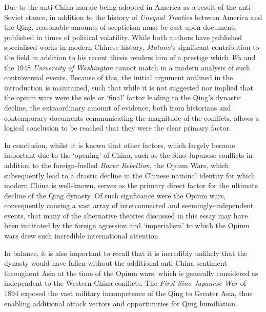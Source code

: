 \documentclass[a4paper,oneside]{article}
\newcommand{\wordcount}{3649}
\newcommand{\wordcountabstract}{3627}
\begin{document}
Due to the anti-China morale being adopted in America as a result of the
anti-Soviet stance, in addition to the history of \textit{Unequal Treaties}
between America and the Qing, reasonable amounts of scepticism must be cast upon
documents published in times of political volatility.  While both authors have
published specialised works in modern Chinese history, \textit{Motono}'s
significant contribution to the field in addition to his recent thesis renders
him of a prestige which \textit{Wu} and the 1948 \textit{University of
Washington} cannot match in a modern analysis of such controversial events.
Because of this, the initial argument outlined in the introduction is
maintained, such that while it is not suggested nor implied that the opium wars
were the sole or `final' factor leading to the Qing's dynastic decline, the
extraordinary amount of evidence, both from historians and contemporary
documents communicating the magnitude of the conflicts, allows a logical
conclusion to be reached that they were the clear primary factor.

In conclusion, whilst it is known that other factors, which largely became
important due to the `opening' of China, such as the Sino-Japanese conflicts in
addition to the foreign-fuelled \textit{Boxer Rebellion}, the Opium Wars, which
subsequently lead to a drastic decline in the Chinese national identity for
which modern China is well-known, serves as the primary direct factor for the
ultimate decline of the Qing dynasty. Of such signficance were the Opium wars,
consequently causing a vast array of interconnected and seemingly-independent
events, that many of the alternative theories discussed in this essay may have
been inititated by the foreign agression and `imperialism' to which the Opium
wars drew such incredible international attention.

In balance, it is also important to recall that it is incredibly unlikely that
the dynasty would have fallen without the additional anti-China sentiment
throughout Asia at the time of the Opium wars, which is generally considered as
independent to the Western-China conflicts. The \textit{First Sino-Japanese War}
of 1894 exposed the vast military incompetence of the Qing to Greater Asia, thus
enabling additional attack vectors and opportunities for Qing humiliation.


\pagebreak
\setcounter{tocdepth}{1}
\printbibliography[title={Cited Works}, heading=bibintoc]
\end{document}
